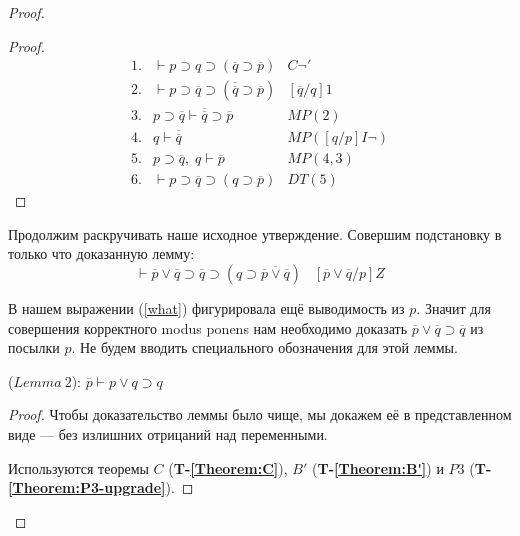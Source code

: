 \begin{proof}
\begin{proof}
        \begin{equation*}
            \begin{array}{llr}
                1. & \vdash p \supset q \supset (\overline{q} \supset \overline{p}) & C\lnot' \\
                2. & \vdash p \supset \overline{q} \supset (\overline{\overline{q}} \supset \overline{p}) & [\overline{q}/q]1\\
                3. & p \supset \overline{q} \vdash \overline{\overline{q}} \supset \overline{p}& MP(2)\\
                4. & q \vdash \overline{\overline{q}} & MP([q/p]I\lnot) \\
                5. & p \supset \overline{q}, \; q \vdash \overline{p} & MP(4,3) \\
                6. & \vdash p \supset \overline{q} \supset (q \supset \overline{p}) & DT(5)
            \end{array}
        \end{equation*}
    \end{proof}

    Продолжим раскручивать наше исходное утверждение. Совершим подстановку в только что доказанную лемму:
    \begin{equation*}
        \vdash 
            \overline{p} \lor \overline{q}
            \supset \overline{q}
        \supset 
        (
            q \supset \overline{\overline{p} \lor \overline{q}}
        ) \;\;\; [\overline{p} \lor \overline{q}/p]Z
    \end{equation*}

    В нашем выражении (\ref{what}) фигурировала ещё выводимость из $p$. Значит для совершения корректного modus ponens нам необходимо доказать $\overline{p} \lor \overline{q} \supset \overline{q}$ из посылки $p$. Не будем вводить специального обозначения для этой леммы.

    \begin{propthm}
        ($Lemma\ 2$): $\overline{p} \vdash p \lor q \supset q$
    \end{propthm}
    \begin{proof}
        Чтобы доказательство леммы было чище, мы докажем её в представленном виде --- без излишних отрицаний над переменными.

        Используются теоремы $C$ (\textbf{T-\ref{Theorem:C}}), $B'$ (\textbf{T-\ref{Theorem:B'}}) и $P3$ (\textbf{T-\ref{Theorem:P3-upgrade}}).


\end{proof}
\end{proof}
